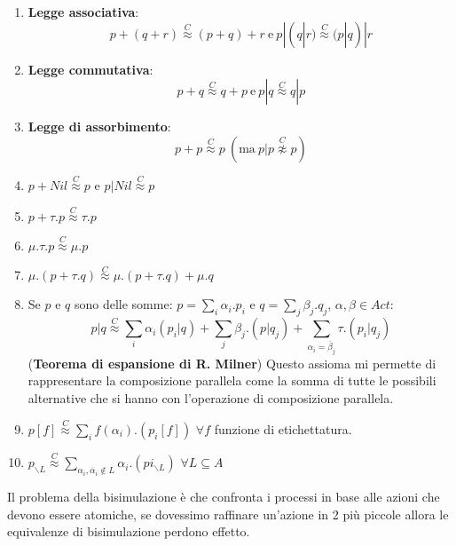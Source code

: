 \begin{enumerate}
    \item \textbf{Legge associativa}:
          \begin{equation}
              p + (q + r) \stackrel{C}{\approx} (p + q) + r \ \text{e} \ p | (q | r)
              \stackrel{C}{\approx} (p | q) | r
          \end{equation}
    \item \textbf{Legge commutativa}:
          \begin{equation}
              p + q \stackrel{C}{\approx} q + p \ \text{e} \ p | q
              \stackrel{C}{\approx} q | p
          \end{equation}
    \item \textbf{Legge di assorbimento}:
          \begin{equation}
              p + p \stackrel{C}{\approx} p \ (\text{ma} \ p | p
              \stackrel{C}{\not\approx} p)
          \end{equation}
    \item $p + Nil \stackrel{C}{\approx} p$ e $p | Nil \stackrel{C}{\approx} p$
    \item $p + \tau . p \stackrel{C}{\approx} \tau . p$
    \item $\mu . \tau . p \stackrel{C}{\approx} \mu . p$
    \item $\mu . (p + \tau . q) \stackrel{C}{\approx} \mu . (p +
              \tau . q) + \mu . q$
    \item Se $p$ e $q$ sono delle somme: $p = \sum_{i} \alpha_i . p_i$ e
          $q = \sum_{j} \beta_j . q_j$,  $\alpha, \beta \in Act$:
          $$p | q \stackrel{C}{\approx} \sum_{i} \alpha_i (p_{i} | q) + \sum_{j}
              \beta_{j} . (p|q_{j}) + \sum_{\alpha_i = \overline{\beta}_{j}}
              \tau . (p_{i} | q_{j})$$
          (\textbf{Teorema di espansione di R. Milner}) Questo assioma mi permette
          di rappresentare la composizione parallela come la somma di tutte le
          possibili alternative che si hanno con l'operazione di composizione
          parallela.
    \item $p[f] \stackrel{C}{\approx} \sum_{i} f(\alpha_i) . (p_{i} [f])$ $\forall f$
          funzione di etichettatura.
    \item $p_{\backslash L} \stackrel{C}{\approx} \sum_{\alpha_i,\overline{\alpha}_i
                  \not\in L} \alpha_i . (pi_{\backslash L})$ $\forall L \subseteq A$
\end{enumerate}
Il problema della bisimulazione è che confronta i processi in base alle azioni che
devono essere atomiche, se dovessimo raffinare un'azione in 2 più piccole allora
le equivalenze di bisimulazione perdono effetto.

